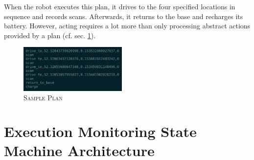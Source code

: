 \documentclass[english, master, utf8]{base/thesis_KBS}
\begin{document}
When the robot executes this plan, it drives to the four specified locations in sequence and records scans.
Afterwards, it returns to the base and recharges its battery. However, acting requires a lot more than only processing abstract actions provided by a plan (cf. sec.
\ref{sec:execution_monitoring_smach_architecture}). \cite{Ingrand:2017}
\begin{figure}[H]
    \centering
    \includegraphics[width=0.475\textwidth]{pics/plan_example.png}
    \caption{\textsc{Sample Plan}}
    \label{fig:plan_example}
\end{figure}
\noindent

\section{Execution Monitoring State Machine Architecture}
\label{sec:execution_monitoring_smach_architecture}
\end{document}
